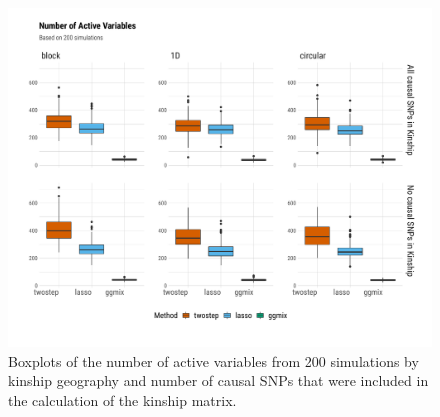 \documentclass[12pt,letter]{article}\usepackage[]{graphicx}\usepackage[]{color}
\newenvironment{knitrout}{}{} %
\begin{document}
\begin{knitrout}\scriptsize
{}\color{fgcolor}\begin{figure}[H]

{\centering \includegraphics[width=1\linewidth]{figure/plot-nactive-sim-1} 

}

\caption[Boxplots of the number of active variables from 200 simulations by kinship geography and number of causal SNPs that were included in the calculation of the kinship matrix]{Boxplots of the number of active variables from 200 simulations by kinship geography and number of causal SNPs that were included in the calculation of the kinship matrix.}\label{fig:plot-nactive-sim}
\end{figure}


\end{knitrout}
\end{document}
